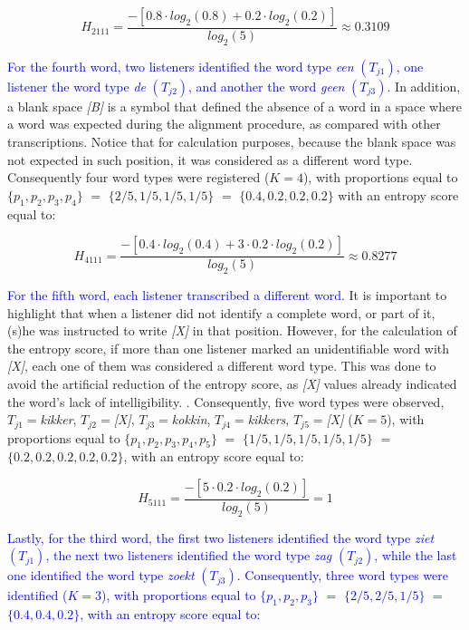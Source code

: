 \documentclass[
  authoryear,
  preprint,
  1p]{elsarticle}
\begin{document}
\[ 
H_{2111} = \frac{ -\left[ 0.8 \cdot log_{2}(0.8) + 0.2 \cdot log_{2}(0.2) \right] }{ log_{2}(5)} \approx 0.3109
\]

\textcolor{blue}{For the fourth word, two listeners identified the word type \emph{een}
\((T_{j1})\), one listener the word type \emph{de} \((T_{j2})\), and
another the word \emph{geen} \((T_{j3})\).} In addition, a blank space
\emph{{[}B{]}} is a symbol that defined the absence of a word in a space
where a word was expected during the alignment procedure, as compared
with other transcriptions. Notice that for calculation purposes, because
the blank space was not expected in such position, it was considered as
a different word type. Consequently four word types were registered
(\(K=4\)), with proportions equal to
\(\{ p_{1}, p_{2}, p_{3}, p_{4} \}\) \(=\) \(\{ 2/5, 1/5, 1/5, 1/5 \}\)
\(=\) \(\{ 0.4, 0.2, 0.2, 0.2 \}\) with an entropy score equal to:

\[ 
H_{4111} = \frac{ -\left[ 0.4 \cdot log_{2}(0.4) + 3 \cdot 0.2 \cdot log_{2}(0.2) \right] }{ log_{2}(5)} \approx 0.8277
\] 

\textcolor{blue}{For the fifth word, each listener transcribed a different word.} It
is important to highlight that when a listener did not identify a
complete word, or part of it, (s)he was instructed to write
\emph{{[}X{]}} in that position. However, for the calculation of the
entropy score, if more than one listener marked an unidentifiable word
with \emph{{[}X{]}}, each one of them was considered a different word
type. This was done to avoid the artificial reduction of the entropy
score, as \emph{{[}X{]}} values already indicated the word's lack of
intelligibility. . Consequently, five word types were observed,
\(T_{j1}=\)\emph{kikker}, \(T_{j2}=\)\emph{{[}X{]}},
\(T_{j3}=\)\emph{kokkin}, \(T_{j4}=\)\emph{kikkers},
\(T_{j5}=\)\emph{{[}X{]}} (\(K=5\)), with proportions equal to
\(\{ p_{1}, p_{2}, p_{3}, p_{4}, p_{5} \}\) \(=\)
\(\{ 1/5, 1/5, 1/5, 1/5, 1/5 \}\) \(=\)
\(\{ 0.2, 0.2, 0.2, 0.2, 0.2 \}\), with an entropy score equal to:

\[ 
H_{5111} = \frac{ -\left[ 5 \cdot 0.2 \cdot log_{2}(0.2) \right] }{ log_{2}(5)} = 1
\]

\textcolor{blue}{Lastly, for the third word, the first two listeners identified the word
type \emph{ziet} \((T_{j1})\), the next two listeners identified the
word type \emph{zag} \((T_{j2})\), while the last one identified the
word type \emph{zoekt} \((T_{j3})\). Consequently, three word types were
identified (\(K=3\)), with proportions equal to
\(\{ p_{1}, p_{2}, p_{3} \}\) \(=\) \(\{ 2/5, 2/5, 1/5 \}\) \(=\)
\(\{ 0.4, 0.4, 0.2 \}\), with an entropy score equal to:}
\end{document}
